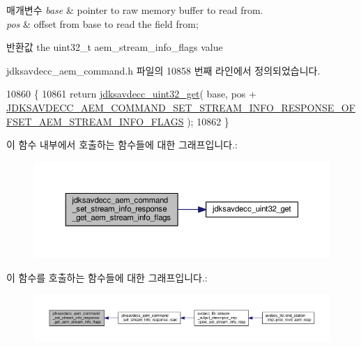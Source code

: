 \begin{DoxyParams}{매개변수}
{\em base} & pointer to raw memory buffer to read from. \\
\hline
{\em pos} & offset from base to read the field from; \\
\hline
\end{DoxyParams}
\begin{DoxyReturn}{반환값}
the uint32\+\_\+t aem\+\_\+stream\+\_\+info\+\_\+flags value 
\end{DoxyReturn}


jdksavdecc\+\_\+aem\+\_\+command.\+h 파일의 10858 번째 라인에서 정의되었습니다.


\begin{DoxyCode}
10860 \{
10861     \textcolor{keywordflow}{return} \hyperlink{group__endian_gaefcf5bd4f368997a82f358ab89052d6b}{jdksavdecc\_uint32\_get}( base, pos + 
      \hyperlink{group__command__set__stream__info__response_ga8ce11146931c1307d45ab83b01c8b190}{JDKSAVDECC\_AEM\_COMMAND\_SET\_STREAM\_INFO\_RESPONSE\_OFFSET\_AEM\_STREAM\_INFO\_FLAGS}
       );
10862 \}
\end{DoxyCode}


이 함수 내부에서 호출하는 함수들에 대한 그래프입니다.\+:
\nopagebreak
\begin{figure}[H]
\begin{center}
\leavevmode
\includegraphics[width=350pt]{group__command__set__stream__info__response_gaf15d543a9197e58bc71d1676fd0d880c_cgraph}
\end{center}
\end{figure}




이 함수를 호출하는 함수들에 대한 그래프입니다.\+:
\nopagebreak
\begin{figure}[H]
\begin{center}
\leavevmode
\includegraphics[width=350pt]{group__command__set__stream__info__response_gaf15d543a9197e58bc71d1676fd0d880c_icgraph}
\end{center}
\end{figure}


